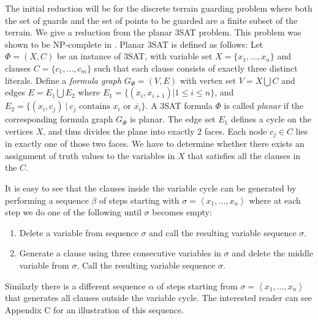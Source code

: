 \documentclass[11pt]{article}
\begin{document}
The initial reduction will be for the discrete terrain guarding problem where both the set of guards and the set of points to be guarded are a finite subset of the terrain.  We give a reduction from the planar 3SAT problem.  This problem was shown to be NP-complete in \cite{L82}.  Planar 3SAT is defined as follows: Let $\Phi = (X,C)$ be an instance of 3SAT, with variable set $X=\{x_1,\ldots,x_n\}$ and clauses $C=\{c_1,\ldots,c_m\}$ such that each clause consists of exactly three distinct literals. Define a \textit{formula graph} $G_\Phi = (V,E)$ with vertex set $V = X\bigcup C$ and edges $E = E_1\bigcup E_2$ where $E_1 = \{(x_i,x_{i+1})|1\le i\le n\}$, and
$E_2 = \{(x_i,c_j) \ | \ c_j \mbox{ contains } x_i \mbox{ or } \overline{x_i}\}$. A 3SAT formula $\Phi$ is called \textit{planar} if the corresponding formula graph $G_\Phi$ is planar. The edge set $E_1$ defines a cycle on the vertices $X$, and thus divides the plane into exactly 2 faces. Each node $c_j\in C$ lies in exactly one of those two faces. We have to determine whether there exists an assignment of truth values to the variables in $X$ that satisfies all the clauses in the $C$.

It is easy to see that the clauses inside the variable cycle can be generated by performing a sequence $\beta$ of steps starting with $\sigma=\left< x_1,\ldots,x_n\right>$ where at each step we do one of the following until $\sigma$ becomes empty:

\begin{enumerate}
 \item Delete a variable from sequence $\sigma$ and call the resulting variable sequence $\sigma$.
 \item Generate a clause using three consecutive variables in $\sigma$ and delete the middle variable from $\sigma$.  Call the resulting variable sequence $\sigma$.
\end{enumerate}

Similarly there is a different sequence $\alpha$ of steps starting from $\sigma=\left<x_1,\ldots,x_n\right>$ that generates all clauses outside the variable cycle.  The interested reader can see Appendix C for an illustration of this sequence.
\end{document}
